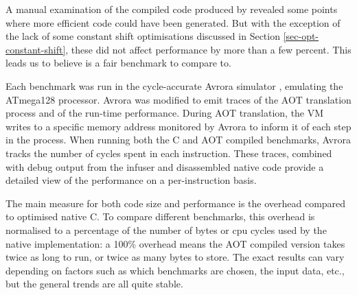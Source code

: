 A manual examination of the compiled code produced by  revealed some points where more efficient code could have been generated. But with the exception of the lack of some constant shift optimisations discussed in Section \ref{sec-opt-constant-shift}, these did not affect performance by more than a few percent. This leads us to believe  is a fair benchmark to compare to.

Each benchmark was run in the cycle-accurate Avrora simulator \cite{Titzer:2005vb}, emulating the ATmega128 processor. Avrora was modified to emit traces of the AOT translation process and of the run-time performance. During AOT translation, the VM writes to a specific memory address monitored by Avrora to inform it of each step in the process. When running both the C and AOT compiled benchmarks, Avrora tracks the number of cycles spent in each instruction. These traces, combined with debug output from the infuser and disassembled native code provide a detailed view of the performance on a per-instruction basis.

The main measure for both code size and performance is the overhead compared to optimised native C. To compare different benchmarks, this overhead is normalised to a percentage of the number of bytes or cpu cycles used by the native implementation: a 100\% overhead means the AOT compiled version takes twice as long to run, or twice as many bytes to store. The exact results can vary depending on factors such as which benchmarks are chosen, the input data, etc., but the general trends are all quite stable.
